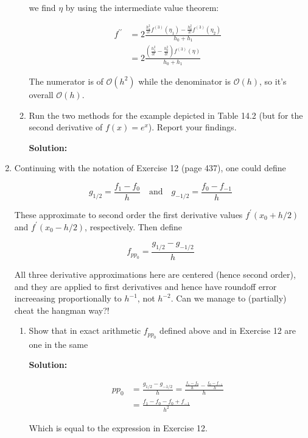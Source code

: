 \documentclass[12pt]{article}
\newcommand{\pprime}{\prime \prime}
\newcommand{\BigO}[1]{\mathcal{O}\left( #1 \right)}
\begin{document}
\begin{enumerate}
\begin{enumerate}
we find $\eta$ by using the intermediate value theorem:

\begin{align*}
f^{\pprime} &=  2\frac{\frac{h_{1}^{2}}{3!}f^{(3)}(\eta_{1}) - \frac{h_{0}^{2}}{3!}f^{(3)}(\eta_{2})}{h_{0} + h_{1}}\\
                    &= 2 \frac{\left(\frac{h_{1}^{2}}{3!} - \frac{h_{0}^{2}}{3!}\right)f^{(3)}(\eta)}{h_{0} + h_{1}}
\end{align*}

The numerator is of $\BigO{h^{2}}$ while the denominator is $\BigO{h}$, so it's overall $\BigO{h}$.

\item Run the two methods for the example depicted in Table 14.2 (but for the second derivative of $f(x) = e^{x}$). Report your findings.

{\bf Solution:}

\end{enumerate}

\item Continuing with the notation of Exercise 12 (page 437), one could define 

\[
	g_{1/2} = \frac{f_{1} - f_{0}}{h}\quad \text{and}\quad g_{-1/2}=\frac{f_{0} - f_{-1}}{h}
\]

These approximate to second order the first derivative values $f^{\prime}(x_{0} + h/2)$ and $f^{\prime}(x_{0} - h/2)$, respectively. Then define

\[
	f_{pp_{0}} = \frac{g_{1/2} - g_{-1/2}}{h}
\]

All three derivative approximations here are centered (hence second order), and they are applied to first derivatives and hence have roundoff error increeasing proportionally to $h^{-1}$, not $h^{-2}$. Can we manage to (partially) cheat the hangman way?!

\begin{enumerate}
\item Show that in exact arithmetic $f_{pp_{0}}$ defined above and in Exercise 12 are one in the same

{\bf Solution:}

\begin{align*}
pp_{0} &= \frac{g_{1/2} - g_{-1/2}}{h} = \frac{\frac{f_{1} - f_{0}}{h} - \frac{f_{0} - f_{-1}}{h}}{h}\\
             &= \frac{f_{1} - f_{0} - f_{0} + f_{-1}}{h^{2}}
\end{align*}

Which is equal to the expression in Exercise 12.


\end{enumerate}
\end{enumerate}
\end{document}

